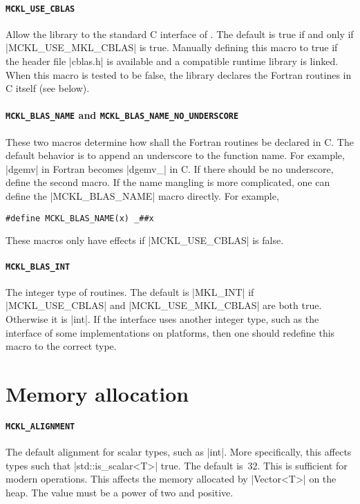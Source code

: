 \paragraph{\texttt{MCKL\_USE\_CBLAS}} Allow the library to the standard C
interface of \blas. The default is true if and only if |MCKL_USE_MKL_CBLAS| is
true. Manually defining this macro to true if the header file |cblas.h| is
available and a compatible runtime library is linked. When this macro is tested
to be false, the library declares the \blas Fortran routines in C itself (see
below).

\paragraph{\texttt{MCKL\_BLAS\_NAME} and
\texttt{MCKL\_BLAS\_NAME\_NO\_UNDERSCORE}} These two macros determine how shall
the \blas Fortran routines be declared in C. The default behavior is to append
an underscore to the function name. For example, |dgemv| in Fortran becomes
|dgemv_| in C. If there should be no underscore, define the second macro. If
the name mangling is more complicated, one can define the |MCKL_BLAS_NAME|
macro directly. For example,
\begin{verbatim}
#define MCKL_BLAS_NAME(x) _##x
\end{verbatim}
These macros only have effects if |MCKL_USE_CBLAS| is false.

\paragraph{\texttt{MCKL\_BLAS\_INT}} The integer type of \blas routines. The
default is |MKL_INT| if |MCKL_USE_CBLAS| and |MCKL_USE_MKL_CBLAS| are both
true. Otherwise it is |int|. If the \blas interface uses another integer type,
such as the \ilp interface of some implementations on \lp platforms, then one
should redefine this macro to the correct type.

\section{Memory allocation}
\label{sec:Memory allocation}

\paragraph{\texttt{MCKL\_ALIGNMENT}} The default alignment for scalar types,
such as |int|. More specifically, this affects types such that
|std::is_scalar<T>| true. The default is~32. This is sufficient for modern
\simd operations. This affects the memory allocated by |Vector<T>| on the heap.
The value must be a power of two and positive.

